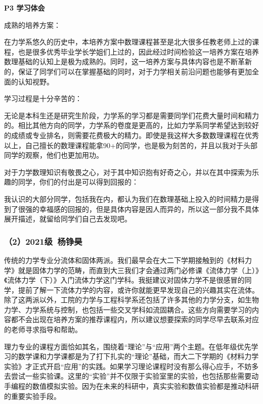 \documentclass[11pt,oneside]{book}
\begin{document}
\vspace{10pt}

\textbf{P3 学习体会}

成熟的培养方案：

在力学系悠久的历史中，本培养方案中数理课程甚至是北大很多任教老师上过的课程，也是很多优秀毕业学长学姐们上过的，因此经过时间检验这一培养方案在培养数理基础的认知上是极为成熟的。同时，这一培养方案与具体内容也是不断革新的，保证了同学们可以在掌握基础的同时，对于力学相关前沿问题也能够有更加全面的认知视野。

\vspace{10pt}

学习过程是十分辛苦的：

无论是本科生还是研究生阶段，力学系的学习都是需要同学们花费大量时间和精力的。相比其他方向的同学，力学系的卷度是更高的，比如力学系同学希望达到较好的成绩或专业排名，则需要花费极大的精力。即使是我这样大多数数理课程在优秀以上，自己擅长的数理课程能拿90+的同学，也是极为刻苦的，并且以我对于头部同学的观察，他们也更加用功。

\vspace{10pt}

对于力学数理知识有敬畏之心，对于其中知识抱有好奇之心，并以在其中探索为乐趣的同学，你们的付出是可以得到回报的：

我认识的大部分同学，包括我在内，都认为我们在数理基础上投入的时间精力是得到了很强的幸福感的回报的，但是具体内容是因人而异的，所以这一部分我不具体展开描述，就留给同学们自己去发现吧。

\subsubsection{（2）2021级\ 杨铮昊}

传统的力学专业分流体和固体两派。我们最早会在大二下学期接触到的《材料力学》就是固体力学的范畴，而直到大三我们才会通过两门必修课《流体力学（上）》《流体力学（下）》入门流体力学这门学科。我挺建议对固体力学不是很感冒的同学，提前了解一下流体力学的内容，或许你就能更早发现自己的兴趣其实在流体。除了这两派以外，工院的力学与工程科学系还包括了许多其他的力学分支，如生物力学、力学系统与控制，也包括一些交叉学科如流固耦合。这些方向需要学习的内容都不会出现在培养方案的推荐课程内，所以建议想要探索的同学尽早去联系对应的老师寻求指导和帮助。

\vspace{10pt}

理力专业的课程方面恰如其名，围绕着“理论”与“应用”两个主题。在低年级优先学习的数学课和力学课都是为了打下扎实的“理论”基础，而大二下学期的《材料力学实验》才正式开启“应用”的实践。如果学习理论课程时没有那么得心应手，不妨多去尝试一些实验课。这里的“实验”并不仅限于实验室里的实验，也包括那些需要动手编程的数值模拟实验。因为在未来的科研中，真实实验和数值实验都是推动科研的重要实验手段。
\end{document}
